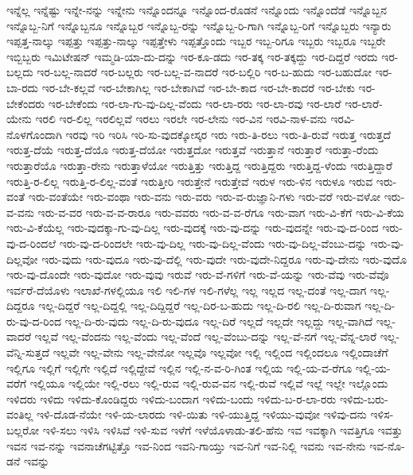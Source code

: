 {ಇನ್ನೆಲ್ಲ
ಇನ್ನೆಷ್ಟು
ಇನ್ನೇ-ನನ್ನು
ಇನ್ನೇನು
ಇನ್ನೊಂದನ್ನೂ
ಇನ್ನೊಂದ-ರೊಡನೆ
ಇನ್ನೊಂದು
ಇನ್ನೊಂದೆಡೆ
ಇನ್ನೊಬ್ಬನ
ಇನ್ನೊಬ್ಬ-ನಿಗೆ
ಇನ್ನೊಬ್ಬನೂ
ಇನ್ನೊಬ್ಬರ
ಇನ್ನೊಬ್ಬ-ರನ್ನು
ಇನ್ನೊಬ್ಬ-ರಿ-ಗಾಗಿ
ಇನ್ನೊಬ್ಬ-ರಿಗೆ
ಇನ್ನೊಬ್ಬರು
ಇನ್ಯಾರು
ಇಪ್ಪತ್ತ-ನಾಲ್ಕು
ಇಪ್ಪತ್ತು
ಇಪ್ಪತ್ತು-ನಾಲ್ಕು
ಇಪ್ಪತ್ತೇಳು
ಇಪ್ಪತ್ತೊಂದು
ಇಬ್ಬರ
ಇಬ್ಬ-ರಿಗೂ
ಇಬ್ಬರು
ಇಬ್ಬರೂ
ಇಬ್ಬರೇ
ಇಬ್ಬಿಬ್ಬರು
ಇಮಿಟೇಷನ್
ಇಮ್ಮಡಿ-ಯಾ-ದು-ದನ್ನು
ಇರ-ಕೂ-ಡದು
ಇರ-ತಕ್ಕ
ಇರ-ತಕ್ಕದ್ದು
ಇರ-ದಿದ್ದರೆ
ಇರದು
ಇರ-ಬಲ್ಲದು
ಇರ-ಬಲ್ಲ-ನಾದರೆ
ಇರ-ಬಲ್ಲರು
ಇರ-ಬಲ್ಲ-ವ-ನಾದರೆ
ಇರ-ಬಲ್ಲಿರಿ
ಇರ-ಬ-ಹುದು
ಇರ-ಬಹುದೋ
ಇರ-ಬಾ-ರದು
ಇರ-ಬೇ-ಕಲ್ಲವೆ
ಇರ-ಬೇಕಾಗಿಲ್ಲ
ಇರ-ಬೇಕಾಗಿವೆ
ಇರ-ಬೇ-ಕಾದ
ಇರ-ಬೇ-ಕಾದರೆ
ಇರ-ಬೇಕು
ಇರ-ಬೇಕೆಂದರು
ಇರ-ಬೇಕೆಂದು
ಇರ-ಲಾ-ಗು-ವು-ದಿಲ್ಲ-ವೆಂದು
ಇರ-ಲಾ-ರರು
ಇರ-ಲಾ-ರವು
ಇರ-ಲಾರೆ
ಇರ-ಲಾರೆ-ಯೇನು
ಇರಲಿ
ಇರ-ಲಿಲ್ಲ
ಇರಲಿಲ್ಲವೆ
ಇರಲು
ಇರಲೇ
ಇರ-ಲೇನು
ಇರ-ವಿನ
ಇರವಿ-ನಾಳ-ವನು
ಇರವಿ-ನೊಳಗೊಂದಾಗಿ
ಇರವು
ಇರಿ
ಇರಿಸಿ
ಇರಿ-ಸು-ವುದಕ್ಕೋಸ್ಕರ
ಇರು
ಇರು-ತಿ-ರಲು
ಇರು-ತಿ-ರುವೆ
ಇರುತ್ತ
ಇರುತ್ತದೆ
ಇರುತ್ತ-ದೆಯೆ
ಇರುತ್ತ-ದೆಯೊ
ಇರುತ್ತ-ದೆಯೋ
ಇರುತ್ತದೋ
ಇರುತ್ತವೆ
ಇರುತ್ತಾನೆ
ಇರುತ್ತಾರೆ
ಇರುತ್ತಾ-ರೆಂದು
ಇರುತ್ತಾರೆಯೊ
ಇರುತ್ತಾ-ರೇನು
ಇರುತ್ತಾಳೆಯೋ
ಇರುತ್ತಿತ್ತು
ಇರುತ್ತಿದ್ದ
ಇರುತ್ತಿದ್ದರು
ಇರುತ್ತಿದ್ದ-ಳೆಂದು
ಇರುತ್ತಿದ್ದಾರೆ
ಇರುತ್ತಿ-ರ-ಲಿಲ್ಲ
ಇರುತ್ತಿ-ರ-ಲಿಲ್ಲ-ವಂತೆ
ಇರುತ್ತೀರಿ
ಇರುತ್ತೇನೆ
ಇರುತ್ತೇವೆ
ಇರುಳ
ಇರು-ಳಿನ
ಇರುಳೂ
ಇರುವ
ಇರು-ವಂತೆ
ಇರು-ವಂತೆಯೇ
ಇರು-ವಂಥಾ
ಇರು-ವನು
ಇರು-ವರು
ಇರು-ವ-ರುಜ್ಞಾನಿ-ಗಳು
ಇರು-ವರೆ
ಇರು-ವಳೋ
ಇರು-ವ-ವನು
ಇರು-ವ-ವರ
ಇರು-ವ-ವ-ರಾರೂ
ಇರು-ವವರು
ಇರು-ವ-ವ-ರೆಗೂ
ಇರು-ವಾಗ
ಇರು-ವಿ-ಕೆಗೆ
ಇರು-ವಿ-ಕೆಯ
ಇರು-ವಿ-ಕೆಯೆಲ್ಲ
ಇರು-ವುದಕ್ಕಾ-ಗು-ವು-ದಿಲ್ಲ
ಇರು-ವುದಕ್ಕೆ
ಇರು-ವು-ದನ್ನು
ಇರು-ವುದನ್ನೇ
ಇರು-ವು-ದ-ರಿಂದ
ಇರು-ವು-ದ-ರಿಂದಲೆ
ಇರು-ವು-ದ-ರಿಂದಲೇ
ಇರು-ವು-ದಿಲ್ಲ
ಇರು-ವು-ದಿಲ್ಲ-ವೆಂದು
ಇರು-ವು-ದಿಲ್ಲ-ವೆಂಬು-ದನ್ನು
ಇರು-ವು-ದಿಲ್ಲವೋ
ಇರು-ವುದು
ಇರು-ವುದೂ
ಇರು-ವು-ದೆಲ್ಲಿ
ಇರು-ವುದೇ
ಇರು-ವುದೇ-ನಿದ್ದರೂ
ಇರು-ವು-ದೇನು
ಇರು-ವುದೊ
ಇರು-ವು-ದೊಂದೇ
ಇರು-ವುದೋ
ಇರು-ವುವು
ಇರುವೆ
ಇರು-ವೆ-ಗಳಿಗೆ
ಇರು-ವೆ-ಯನ್ನು
ಇರು-ವೆವು
ಇರು-ವೆವೊ
ಇರ್ವರೆ-ದೆಯೊಳು
ಇಲಾಖೆ-ಗಳಲ್ಲಿಯೂ
ಇಲಿ
ಇಲಿ-ಗಳ
ಇಲಿ-ಗಳೆಲ್ಲ
ಇಲ್ಲ
ಇಲ್ಲದ
ಇಲ್ಲ-ದಂತೆ
ಇಲ್ಲ-ದಾಗ
ಇಲ್ಲ-ದಿದ್ದರೂ
ಇಲ್ಲ-ದಿದ್ದರೆ
ಇಲ್ಲ-ದಿದ್ದಲ್ಲಿ
ಇಲ್ಲ-ದಿದ್ದಿದ್ದರೆ
ಇಲ್ಲ-ದಿರ-ಬ-ಹುದು
ಇಲ್ಲ-ದಿ-ರಲಿ
ಇಲ್ಲ-ದಿ-ರುವಾಗ
ಇಲ್ಲ-ದಿ-ರು-ವು-ದ-ರಿಂದ
ಇಲ್ಲ-ದಿ-ರು-ವುದು
ಇಲ್ಲ-ದಿ-ರು-ವುದೂ
ಇಲ್ಲ-ದಿರೆ
ಇಲ್ಲದೆ
ಇಲ್ಲದೇ
ಇಲ್ಲದ್ದು
ಇಲ್ಲ-ವಾಗಿದೆ
ಇಲ್ಲ-ವಾದರೆ
ಇಲ್ಲವೆ
ಇಲ್ಲ-ವೆಂದನು
ಇಲ್ಲ-ವೆಂದು
ಇಲ್ಲ-ವೆಂದೆ
ಇಲ್ಲ-ವೆಂಬು-ದನ್ನು
ಇಲ್ಲ-ವೆ-ನಗೆ
ಇಲ್ಲ-ವೆನ್ನ-ಲಾರೆ
ಇಲ್ಲ-ವೆನ್ನಿ-ಸುತ್ತದೆ
ಇಲ್ಲವೇ
ಇಲ್ಲ-ವೇನು
ಇಲ್ಲ-ವೇನೋ
ಇಲ್ಲವೊ
ಇಲ್ಲವೋ
ಇಲ್ಲಿ
ಇಲ್ಲಿಂದ
ಇಲ್ಲಿಂದಲೂ
ಇಲ್ಲಿಂದಾಚೆಗೆ
ಇಲ್ಲಿಗೂ
ಇಲ್ಲಿಗೆ
ಇಲ್ಲಿಗೇ
ಇಲ್ಲಿದೆ
ಇಲ್ಲಿದ್ದೇವೆ
ಇಲ್ಲಿನ
ಇಲ್ಲಿ-ನ-ವ-ರಿ-ಗಿಂತ
ಇಲ್ಲಿಯ
ಇಲ್ಲಿ-ಯ-ವ-ರೆಗೂ
ಇಲ್ಲಿ-ಯ-ವರೆಗೆ
ಇಲ್ಲಿಯೂ
ಇಲ್ಲಿಯೇ
ಇಲ್ಲಿ-ರಲು
ಇಲ್ಲಿ-ರುವ
ಇಲ್ಲಿ-ರುವ-ವನ
ಇಲ್ಲಿ-ರುವೆ
ಇಲ್ಲಿವೆ
ಇಲ್ಲೆ
ಇಲ್ಲೇ
ಇಲ್ಲೊಂದು
ಇಳಿದರು
ಇಳಿದು
ಇಳಿದು-ಕೊಂಡಿದ್ದರು
ಇಳಿದು-ಬಂದಾಗ
ಇಳಿದು-ಬಂದು
ಇಳಿದು-ಬ-ರ-ಲಾ-ರರು
ಇಳಿದು-ಬರು-ವಂತಿಲ್ಲ
ಇಳಿ-ದೊಡ-ನೆಯೇ
ಇಳಿ-ಯ-ಲಾರದು
ಇಳಿ-ಯಿತು
ಇಳಿ-ಯುತ್ತಿದ್ದ
ಇಳಿಯು-ವುವೋ
ಇಳಿವು-ದನು
ಇಳಿಸ-ಬಲ್ಲರೋ
ಇಳಿ-ಸಲು
ಇಳಿಸಿ
ಇಳಿಸಿವೆ
ಇಳಿ-ಸುವ
ಇಳೆಗೆ
ಇಳೆಯೊಳಾಡು-ತಲಿ-ಹೆನು
ಇವ
ಇವಕ್ಕಾಗಿ
ಇವತ್ತಿಗೂ
ಇವತ್ತು
ಇವನ
ಇವ-ನನ್ನು
ಇವನಾಚೆಗಟ್ಟಿತ್ತೊ
ಇವ-ನಿಂದ
ಇವನಿ-ಗಾಯ್ತು
ಇವ-ನಿಗೆ
ಇವ-ನಿಲ್ಲಿ
ಇವನು
ಇವ-ನೇನು
ಇವ-ನೊ-ಡನೆ
ಇವನ್ನು
}
